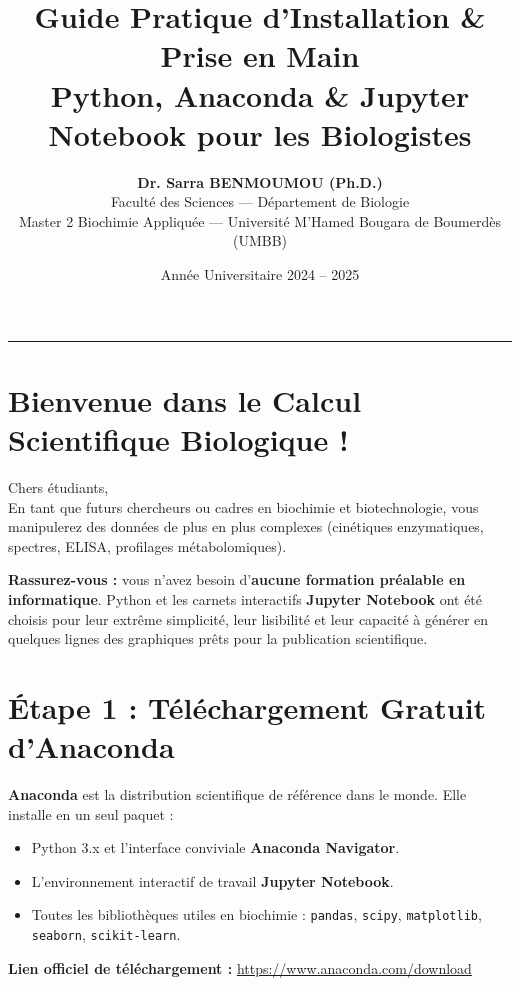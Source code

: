 \documentclass[11pt,a4paper]{article}
\title{\textbf{\LARGE Guide Pratique d'Installation \& Prise en Main}\\
\Large Python, Anaconda \& Jupyter Notebook pour les Biologistes}
\author{\textbf{Dr. Sarra BENMOUMOU (Ph.D.)}\\
\small Faculté des Sciences --- Département de Biologie\\
\small Master 2 Biochimie Appliquée --- Université M'Hamed Bougara de Boumerdès (UMBB)}
\date{Année Universitaire 2024 -- 2025}
\begin{document}
\maketitle

\vspace{-5mm}
\begin{center}
  \rule{\textwidth}{1pt}
\end{center}

\section*{\faGraduationCap\hspace{0.5em}Bienvenue dans le Calcul Scientifique Biologique !}
Chers étudiants,\\
En tant que futurs chercheurs ou cadres en biochimie et biotechnologie, vous manipulerez des données de plus en plus complexes (cinétiques enzymatiques, spectres, ELISA, profilages métabolomiques).

\textbf{Rassurez-vous :} vous n'avez besoin d'\textbf{aucune formation préalable en informatique}. Python et les carnets interactifs \textbf{Jupyter Notebook} ont été choisis pour leur extrême simplicité, leur lisibilité et leur capacité à générer en quelques lignes des graphiques prêts pour la publication scientifique.

\section*{\faDownload\hspace{0.5em}Étape 1 : Téléchargement Gratuit d'Anaconda}
\textbf{Anaconda} est la distribution scientifique de référence dans le monde. Elle installe en un seul paquet :
\begin{itemize}
  \item Python 3.x et l'interface conviviale \textbf{Anaconda Navigator}.
  \item L'environnement interactif de travail \textbf{Jupyter Notebook}.
  \item Toutes les bibliothèques utiles en biochimie : \texttt{pandas}, \texttt{scipy}, \texttt{matplotlib}, \texttt{seaborn}, \texttt{scikit-learn}.
\end{itemize}

\textbf{Lien officiel de téléchargement :} \url{https://www.anaconda.com/download}
\end{document}
